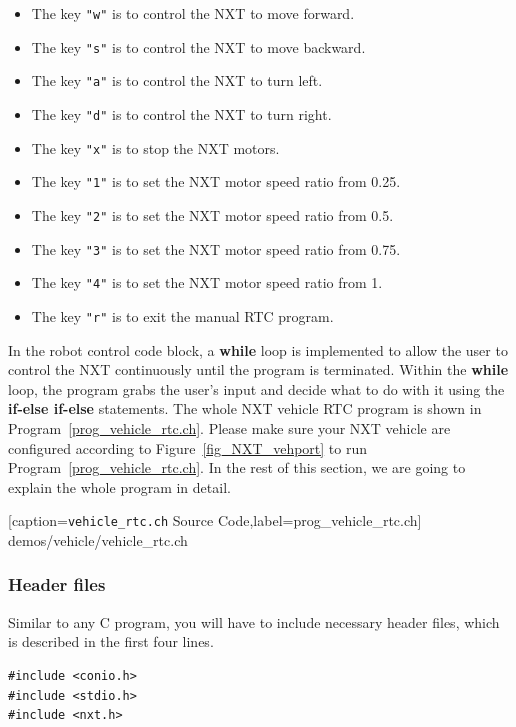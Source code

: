 \documentclass[11pt]{article}
\begin{document}
\begin{itemize}
\item The key {\tt "w"} is to control the NXT to move forward.
\item The key {\tt "s"} is to control the NXT to move backward.
\item The key {\tt "a"} is to control the NXT to turn left.
\item The key {\tt "d"} is to control the NXT to turn right.
\item The key {\tt "x"} is to stop the NXT motors.
\item The key {\tt "1"} is to set the NXT motor speed ratio from 0.25.
\item The key {\tt "2"} is to set the NXT motor speed ratio from 0.5.
\item The key {\tt "3"} is to set the NXT motor speed ratio from 0.75.
\item The key {\tt "4"} is to set the NXT motor speed ratio from 1.
\item The key {\tt "r"} is to exit the manual RTC program.
\end{itemize}
In the robot control code block, a {\bf while} loop is implemented to allow the 
user to control the NXT continuously until the program is terminated. Within the 
{\bf while} loop, the program grabs the user's input and decide what to do with 
it using the {\bf if-else if-else} statements. The whole NXT vehicle RTC program 
is shown in Program~\ref{prog_vehicle_rtc.ch}. Please make sure your NXT vehicle 
are configured according to Figure~\ref{fig_NXT_vehport} to run Program~\ref{prog_vehicle_rtc.ch}. 
In the rest of this section, we are going to explain the whole program in detail.


[caption={{\tt vehicle\_rtc.ch} Source Code},label=prog_vehicle_rtc.ch]
{demos/vehicle/vehicle_rtc.ch}

\subsubsection*{Header files}
Similar to any C program, you will have to include necessary header files, which 
is described in the first four lines.
\begin{lstlisting}
#include <conio.h>
#include <stdio.h>
#include <nxt.h>
\end{lstlisting}
\end{document}
